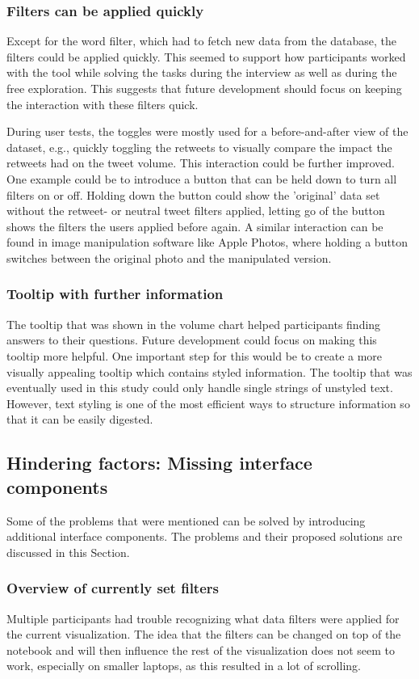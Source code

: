 \subsubsection*{Filters can be applied quickly}
Except for the word filter, which had to fetch new data from the database, the filters could be applied quickly. This seemed to support how participants worked with the tool while solving the tasks during the interview as well as during the free exploration. This suggests that future development should focus on keeping the interaction with these filters quick.

During user tests, the toggles were mostly used for a before-and-after view of the dataset, e.g., quickly toggling the retweets to visually compare the impact the retweets had on the tweet volume. This interaction could be further improved. One example could be to introduce a button that can be held down to turn all filters on or off. Holding down the button could show the 'original' data set without the retweet- or neutral tweet filters applied, letting go of the button shows the filters the users applied before again. A similar interaction can be found in image manipulation software like Apple Photos, where holding a button switches between the original photo and the manipulated version.

\subsubsection*{Tooltip with further information}
The tooltip that was shown in the volume chart helped participants finding answers to their questions. Future development could focus on making this tooltip more helpful. One important step for this would be to create a more visually appealing tooltip which contains styled information. The tooltip that was eventually used in this study could only handle single strings of unstyled text. However, text styling is one of the most efficient ways to structure information so that it can be easily digested. 

\subsection{Hindering factors: Missing interface components}
Some of the problems that were mentioned can be solved by introducing additional interface components. The problems and their proposed solutions are discussed in this Section.

\subsubsection*{Overview of currently set filters}
Multiple participants had trouble recognizing what data filters were applied for the current visualization. The idea that the filters can be changed on top of the notebook and will then influence the rest of the visualization does not seem to work, especially on smaller laptops, as this resulted in a lot of scrolling.

